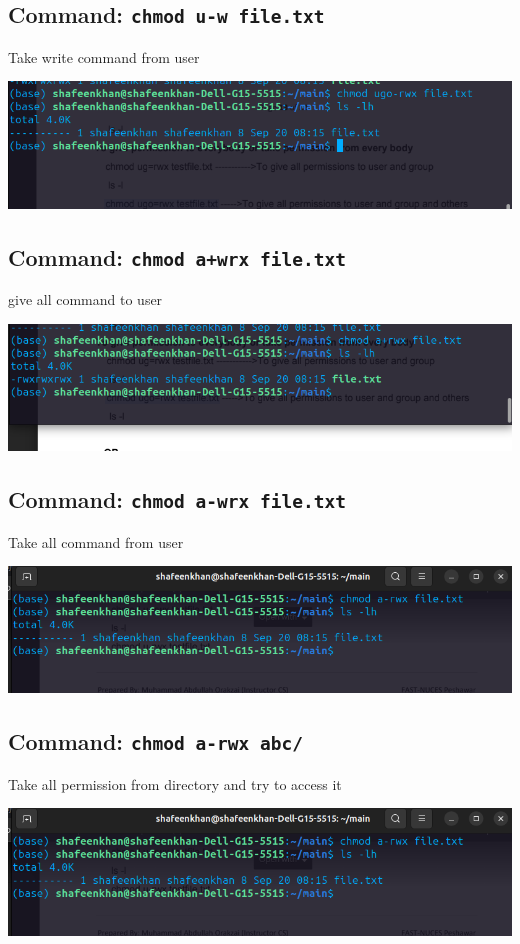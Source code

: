 \documentclass[a4paper,12pt]{article}
\begin{document}
\subsection{Command: \texttt{chmod u-w file.txt}}
Take write command from user
\begin{center}
    \includegraphics[width=\linewidth]{Screenshot from 2024-09-20 09-18-13.png}
\end{center}

\subsection{Command: \texttt{chmod a+wrx file.txt}}
give all command to user
\begin{center}
    \includegraphics[width=\linewidth]{Screenshot from 2024-09-20 09-18-24.png}
\end{center}

\subsection{Command: \texttt{chmod a-wrx file.txt}}
Take all command from user
\begin{center}
    \includegraphics[width=\linewidth]{Screenshot from 2024-09-20 09-18-50.png}
\end{center}

\subsection{Command: \texttt{chmod a-rwx abc/}}
Take all permission from directory
and try to access it
\begin{center}
    \includegraphics[width=\linewidth]{Screenshot from 2024-09-20 09-18-50.png}
\end{center}
\end{document}
